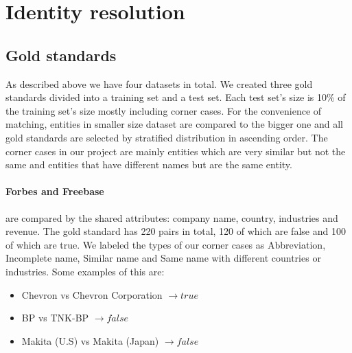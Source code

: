 \section{Identity resolution}
\subsection{Gold standards}
As described above we have four datasets in total. We created three gold standards divided into a training set and a test set. Each test set's size is 10\% of the training set's size mostly including corner cases. For the convenience of matching, entities in smaller size dataset are compared to the bigger one and all gold standards are selected by stratified distribution in ascending order. The corner cases in our project are mainly entities which are very similar but not the same and entities that have different names but are the same entity.
\paragraph{Forbes and Freebase} are compared by the shared attributes: company name, country, industries and revenue. The gold standard has 220 pairs in total, 120 of which are false and 100 of which are true. We labeled the types of our corner cases as Abbreviation, Incomplete name, Similar name and Same name with different countries or industries. Some examples of this are:
\begin{itemize}[noitemsep,topsep=0pt,parsep=0pt,partopsep=0pt]
\item Chevron vs Chevron Corporation $\longrightarrow true$
\item BP vs TNK-BP $\longrightarrow false$ 
\item Makita (U.S) vs Makita (Japan) $\longrightarrow false$
\end{itemize}


